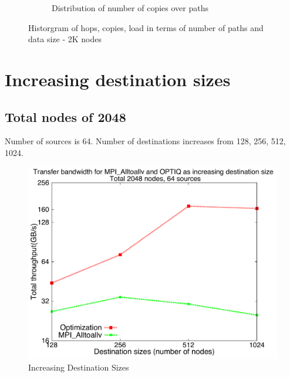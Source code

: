 \documentclass[letter]{article}
\begin{document}
\begin{figure}[!htbp]
\begin{subfigure}[b]{0.49\textwidth}
                \caption{Distribution of number of copies over paths}
                \label{fig:incrdist_2k_hopcopy}
        \end{subfigure}
        \caption{Historgram of hops, copies, load in terms of number of paths and data size - 2K nodes}
        \label{fig:incrdist_2k_histo}
\end{figure}

\clearpage
\newpage

\section {Increasing destination sizes}

\subsection{Total nodes of 2048}

Number of sources is 64. Number of destinations increases from 128, 256, 512, 1024. 

\begin{figure}[h]
\vspace{-0.1in}
\centering
\includegraphics[scale=0.40]{report_figures/incrsize/incrsize_2k.pdf}
\vspace{-0.1in}
\caption{Increasing Destination Sizes}
\vspace{-0.1in}
\label{fig:incrsize_2k}
\end{figure}
\end{document}
